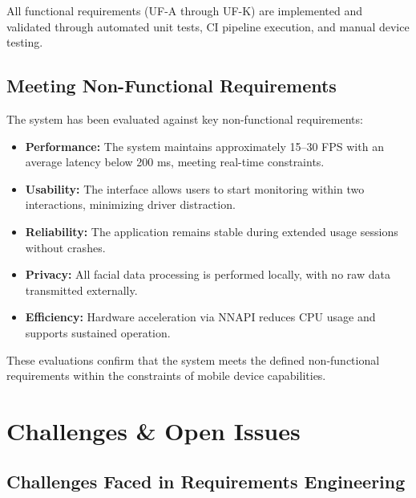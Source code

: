 \documentclass[11pt]{report}
\begin{document}
All functional requirements (UF-A through UF-K) are implemented and validated through automated unit tests, CI pipeline execution, and manual device testing.

\section{Meeting Non-Functional Requirements} %

The system has been evaluated against key non-functional requirements:

\begin{itemize}
    \item \textbf{Performance:} The system maintains approximately 15--30 FPS with an average latency below 200 ms, meeting real-time constraints.

    \item \textbf{Usability:} The interface allows users to start monitoring within two interactions, minimizing driver distraction.

    \item \textbf{Reliability:} The application remains stable during extended usage sessions without crashes.

    \item \textbf{Privacy:} All facial data processing is performed locally, with no raw data transmitted externally.

    \item \textbf{Efficiency:} Hardware acceleration via NNAPI reduces CPU usage and supports sustained operation.
\end{itemize}

These evaluations confirm that the system meets the defined non-functional requirements within the constraints of mobile device capabilities.

\chapter{Challenges \& Open Issues}

\section{Challenges Faced in Requirements Engineering}
\end{document}
